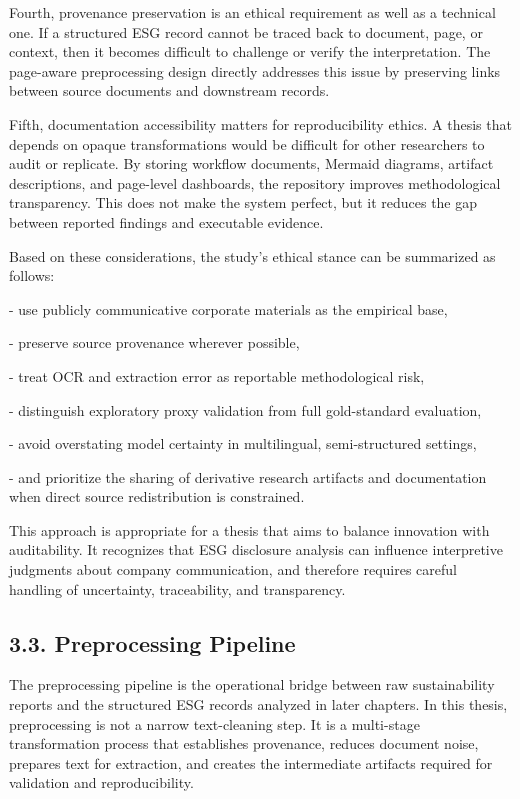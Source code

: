 \documentclass{article}
\begin{document}
Fourth, provenance preservation is an ethical requirement as well as a technical one. If a structured ESG record cannot be traced back to document, page, or context, then it becomes difficult to challenge or verify the interpretation. The page-aware preprocessing design directly addresses this issue by preserving links between source documents and downstream records.

Fifth, documentation accessibility matters for reproducibility ethics. A thesis that depends on opaque transformations would be difficult for other researchers to audit or replicate. By storing workflow documents, Mermaid diagrams, artifact descriptions, and page-level dashboards, the repository improves methodological transparency. This does not make the system perfect, but it reduces the gap between reported findings and executable evidence.

Based on these considerations, the study’s ethical stance can be summarized as follows:

- use publicly communicative corporate materials as the empirical base,

- preserve source provenance wherever possible,

- treat OCR and extraction error as reportable methodological risk,

- distinguish exploratory proxy validation from full gold-standard evaluation,

- avoid overstating model certainty in multilingual, semi-structured settings,

- and prioritize the sharing of derivative research artifacts and documentation when direct source redistribution is constrained.

This approach is appropriate for a thesis that aims to balance innovation with auditability. It recognizes that ESG disclosure analysis can influence interpretive judgments about company communication, and therefore requires careful handling of uncertainty, traceability, and transparency.
\subsection*{ 3.3. Preprocessing Pipeline}

The preprocessing pipeline is the operational bridge between raw sustainability reports and the structured ESG records analyzed in later chapters. In this thesis, preprocessing is not a narrow text-cleaning step. It is a multi-stage transformation process that establishes provenance, reduces document noise, prepares text for extraction, and creates the intermediate artifacts required for validation and reproducibility.
\end{document}
